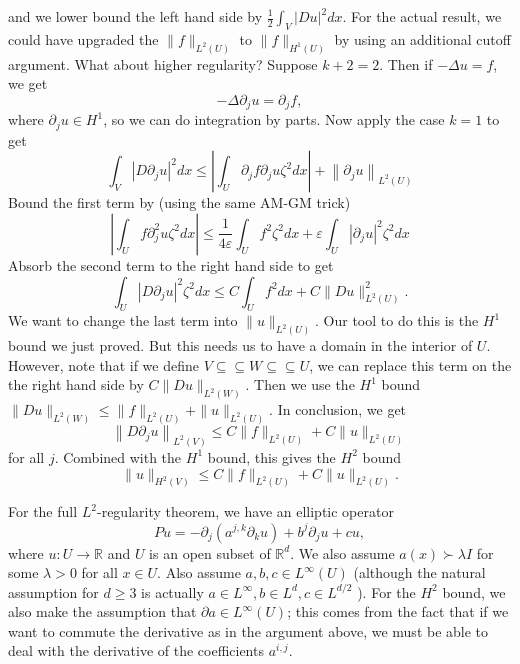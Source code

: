 and we lower bound the left hand side by $\frac{1}{2} \int_{V}|D u|^{2} d x$. For the actual result, we could have upgraded the $\|f\|_{L^{2}(U)}$ to $\|f\|_{H^{1}(U)}$ by using an additional cutoff argument.
What about higher regularity? Suppose $k+2=2$. Then if $-\Delta u=f$, we get
$$
-\Delta \partial_{j} u=\partial_{j} f,
$$
where $\partial_{j} u \in H^{1}$, so we can do integration by parts. Now apply the case $k=1$ to get
$$
\int_{V}\left|D \partial_{j} u\right|^{2} d x \leq\left|\int_{U} \partial_{j} f \partial_{j} u \zeta^{2} d x\right|+\left\|\partial_{j} u\right\|_{L^{2}(U)}
$$
Bound the first term by (using the same AM-GM trick)
$$
\left|\int_{U} f \partial_{j}^{2} u \zeta^{2} d x\right| \leq \frac{1}{4 \varepsilon} \int_{U} f^{2} \zeta^{2} d x+\varepsilon \int_{U}\left|\partial_{j} u\right|^{2} \zeta^{2} d x
$$
Absorb the second term to the right hand side to get
$$
\int_{U}\left|D \partial_{j} u\right|^{2} \zeta^{2} d x \leq C \int_{U} f^{2} d x+C\|D u\|_{L^{2}(U)}^{2} .
$$
We want to change the last term into $\|u\|_{L^{2}(U)}$. Our tool to do this is the $H^{1}$ bound we just proved. But this needs us to have a domain in the interior of $U$. However, note that if we define $V \subseteq \subseteq W \subseteq \subseteq U$, we can replace this term on the the right hand side by $C\|D u\|_{L^{2}(W)}$. Then we use the $H^{1}$ bound $\|D u\|_{L^{2}(W)} \leq\|f\|_{L^{2}(U)}+\|u\|_{L^{2}(U)}$. In conclusion, we get
$$
\left\|D \partial_{j} u\right\|_{L^{2}(V)} \leq C\|f\|_{L^{2}(U)}+C\|u\|_{L^{2}(U)}
$$
for all $j$. Combined with the $H^{1}$ bound, this gives the $H^{2}$ bound
$$
\|u\|_{H^{2}(V)} \leq C\|f\|_{L^{2}(U)}+C\|u\|_{L^{2}(U)} .
$$

For the full $L^{2}$-regularity theorem, we have an elliptic operator
$$
P u=-\partial_{j}\left(a^{j, k} \partial_{k} u\right)+b^{j} \partial_{j} u+c u,
$$
where $u: U \rightarrow \mathbb{R}$ and $U$ is an open subset of $\mathbb{R}^{d}$. We also assume $a(x) \succ \lambda I$ for some $\lambda>0$ for all $x \in U$. Also assume $a, b, c \in L^{\infty}(U)$ (although the natural assumption for $d \geq 3$ is actually $a \in L^{\infty}, b \in L^{d}, c \in L^{d / 2}$ ). For the $H^{2}$ bound, we also make the assumption that $\partial a \in L^{\infty}(U)$; this comes from the fact that if we want to commute the derivative as in the argument above, we must be able to deal with the derivative of the coefficients $a^{i, j}$.


